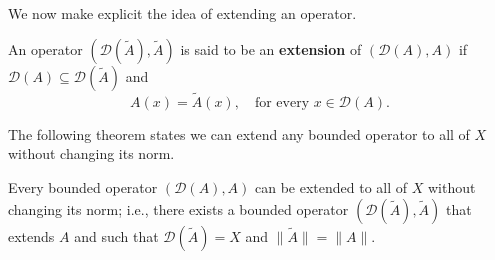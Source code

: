 \begingroup
{}
\renewcommand{\endProof}{\par\nobreak\hfill$\blacksquare$\par\vspace{0.1cm}}
\endgroup

We now make explicit the idea of extending an operator.

\begin{Definition}
\label{def:linear-operator-extension}
An operator $(\mathcal{D}(\widetilde A),\widetilde A)$ is said to be an \textbf{extension} of $(\mathcal{D}(A),A)$ if $\mathcal{D}(A)\subseteq\mathcal{D}(\widetilde A)$ and
\begin{equation}\label{eq:linear-operator-extension-agreement}
A(x)=\widetilde A(x),\quad\text{for every }x\in\mathcal{D}(A).
\end{equation}

\end{Definition}

The following theorem states we can extend any bounded operator to all of $X$ without changing its norm.

\begin{Theorem}
\label{thm:bounded-operator-norm-preserving-extension}
Every bounded operator $(\mathcal{D}(A),A)$ can be extended to all of $X$ without changing its norm; i.e., there exists a bounded operator $(\mathcal{D}(\widetilde A),\widetilde A)$ that extends $A$ and such that $\mathcal{D}(\widetilde A)=X$ and $\|\widetilde A\|=\|A\|$.
\end{Theorem}

